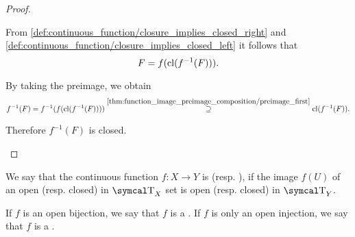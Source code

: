 \begin{proof}
\begin{description}
    From \cref{def:continuous_function/closure_implies_closed_right} and \cref{def:continuous_function/closure_implies_closed_left} it follows that
    \begin{equation*}
      F = f(\operatorname{cl}(f^{-1}(F))).
    \end{equation*}

    By taking the preimage, we obtain
    \begin{equation*}
      f^{-1}(F)
      =
      f^{-1}(f(\operatorname{cl}(f^{-1}(F))))
      \overset {\ref{thm:function_image_preimage_composition/preimage_first}} \supseteq
      \operatorname{cl}(f^{-1}(F)).
    \end{equation*}

    Therefore \( f^{-1}(F) \) is closed.
  \end{description}
\end{proof}

\begin{definition}\label{def:homeomorphism}
  We say that the continuous function \( f: X \to Y \) is  (resp. ), if the image \( f(U) \) of an open (resp. closed) in \( \CT_X \) set is open (resp. closed) in \( \CT_Y \).

  If \( f \) is an open bijection, we say that \( f \) is a . If \( f \) is only an open injection, we say that \( f \) is a .
\end{definition}

